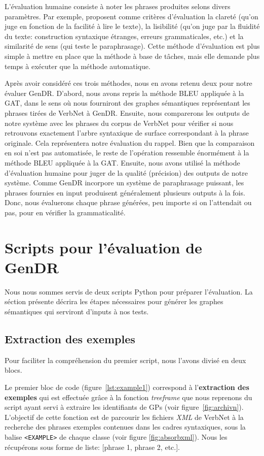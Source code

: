 L'évaluation humaine consiste à noter les phrases produites selons divers paramètres. Par exemple, \cite{BelzFirstSurfaceRealisation2011} proposent comme critères d'évaluation la clareté (qu'on juge en fonction de la facilité à lire le texte), la lisibilité (qu'on juge par la fluidité du texte: construction syntaxique étranges, erreurs grammaticales, etc.) et la similarité de sens (qui teste le paraphrasage). Cette méthode d'évaluation est plus simple à mettre en place que la méthode à base de tâches, mais elle demande plus temps à exécuter que la méthode automatique.
 
Après avoir considéré ces trois méthodes, nous en avons retenu deux pour notre évaluer GenDR. D'abord, nous avons repris la méthode BLEU appliquée à la \ac{GAT}, dans le sens où nous fourniront des graphes sémantiques représentant les phrases tirées de VerbNet à GenDR. Ensuite, nous comparerons les outputs de notre système avec les phrases du corpus de VerbNet pour vérifier si nous retrouvons exactement l'arbre syntaxique de surface correspondant à la phrase originale. Cela représentera notre évaluation du rappel. Bien que la comparaison en soi n'est pas automatisée, le reste de l'opération ressemble énormément à la méthode BLEU appliquée à la \ac{GAT}. Ensuite, nous avons utilisé la méthode d'évaluation humaine pour juger de la qualité (précision) des outputs de notre système. Comme GenDR incorpore un système de paraphrasage puissant, les phrases fournies en input produisent généralement plusieurs outputs à la fois. Donc, nous évaluerons chaque phrase générées, peu importe si on l'attendait ou pas, pour en vérifier la grammaticalité.

\section{Scripts pour l'évaluation de GenDR}

Nous nous sommes servis de deux scripts Python pour préparer l'évaluation. La séction présente décrira les étapes nécessaires pour générer les graphes sémantiques qui serviront d'inputs à nos tests.

\subsection{Extraction des exemples}

Pour faciliter la compréhension du premier script, nous l'avons divisé en deux blocs. 

Le premier bloc de code (figure~\ref{lst:example1}) correspond à l'\textbf{extraction des exemples} qui est effectuée grâce à la fonction \emph{treeframe} que nous reprenons du script ayant servi à extraire les identifiants de \acp{GP} (voir figure~\ref{fig:archivn}). L'objectif de cette fonction est de parcourir les fichiers \emph{XML} de VerbNet à la recherche des phrases exemples contenues dans les cadres syntaxiques, sous la balise \texttt{<EXAMPLE>} de chaque classe (voir figure \ref{fig:absorbxml}). Nous les récupérons sous forme de liste: [phrase 1, phrase 2, etc.].

